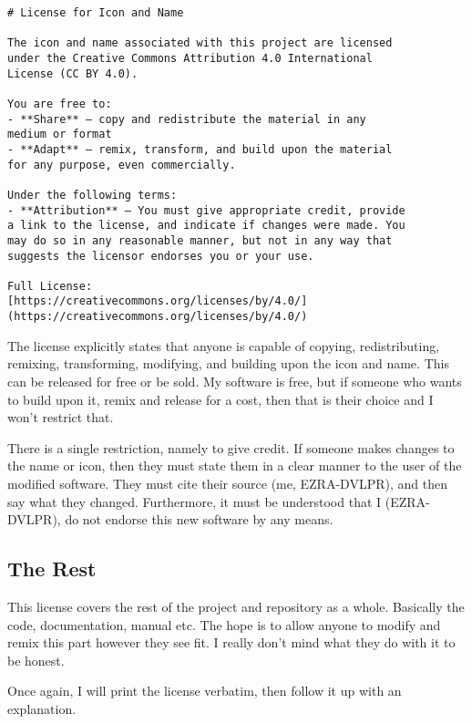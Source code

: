 \newpage

\begin{verbatim}
# License for Icon and Name

The icon and name associated with this project are licensed
under the Creative Commons Attribution 4.0 International
License (CC BY 4.0).

You are free to:
- **Share** — copy and redistribute the material in any
medium or format
- **Adapt** — remix, transform, and build upon the material
for any purpose, even commercially.

Under the following terms:
- **Attribution** — You must give appropriate credit, provide
a link to the license, and indicate if changes were made. You
may do so in any reasonable manner, but not in any way that
suggests the licensor endorses you or your use.

Full License:
[https://creativecommons.org/licenses/by/4.0/]
(https://creativecommons.org/licenses/by/4.0/)
\end{verbatim}

\newpage

The license explicitly states that anyone is capable
of copying, redistributing, remixing, transforming, modifying, and
building upon the icon and name. This can be released for free or
be sold. My software is free, but if someone who wants to build upon
it, remix and release for a cost, then that is their choice and I
won't restrict that.

There is a single restriction, namely to give
credit. If someone makes changes to the name or icon, then they must
state them in a clear manner to the user of the modified software.
They must cite their source
(me, EZRA-DVLPR), and then say what they changed. Furthermore, it
must be understood that I (EZRA-DVLPR), do not endorse this new
software by any means.

\subsection{The Rest}

This license covers the rest of the project and repository as a
whole. Basically the code, documentation, manual etc. The hope is to
allow anyone to modify and remix this part however they see fit. I
really don't mind what they do with it to be honest.

Once again, I will print the license verbatim, then follow it up with
an explanation.

\newpage

